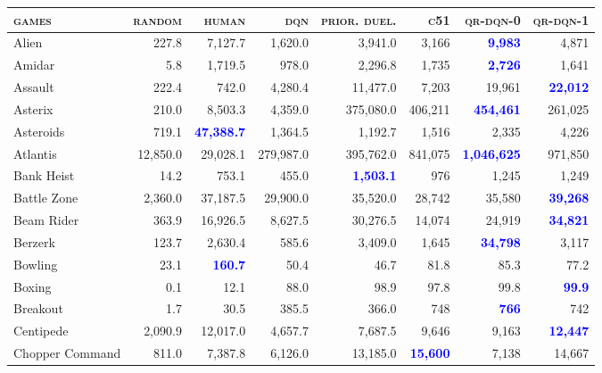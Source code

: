 \documentclass[letterpaper]{article}
\begin{document}
\newpage

\begin{figure}
\small
\centering
\begin{tabular}{ l | r|r|r|r|r|r| r }
  \textbf{\textsc{games}}  &  \textbf{\textsc{random}}  &  \textbf{\textsc{human}}  &  \textbf{\textsc{dqn}}  &   \textbf{\textsc{prior.}} \textbf{\textsc{duel.}}  &  \textbf{\textsc{c51}} & \textbf{\textsc{qr-dqn-0}} & \textbf{\textsc{qr-dqn-1}}\\
\hline
Alien & 227.8 & 7,127.7 & 1,620.0 & 3,941.0 & 3,166 & \textbf{\textcolor{blue}{9,983}} & 4,871 \\
Amidar & 5.8 & 1,719.5 & 978.0 & 2,296.8 & 1,735 & \textbf{\textcolor{blue}{2,726}} & 1,641 \\
Assault & 222.4 & 742.0 & 4,280.4 & 11,477.0 & 7,203 & 19,961 & \textbf{\textcolor{blue}{22,012}} \\
Asterix & 210.0 & 8,503.3 & 4,359.0 & 375,080.0 & 406,211 & \textbf{\textcolor{blue}{454,461}} & 261,025 \\
Asteroids & 719.1 & \textbf{\textcolor{blue}{47,388.7}} & 1,364.5 & 1,192.7 & 1,516 & 2,335 & 4,226 \\
Atlantis & 12,850.0 & 29,028.1 & 279,987.0 & 395,762.0 & 841,075 & \textbf{\textcolor{blue}{1,046,625}} & 971,850 \\
Bank Heist & 14.2 & 753.1 & 455.0 & \textbf{\textcolor{blue}{1,503.1}} & 976 & 1,245 & 1,249 \\
Battle Zone & 2,360.0 & 37,187.5 & 29,900.0 & 35,520.0 & 28,742 & 35,580 & \textbf{\textcolor{blue}{39,268}} \\
Beam Rider & 363.9 & 16,926.5 & 8,627.5 & 30,276.5 & 14,074 & 24,919 & \textbf{\textcolor{blue}{34,821}} \\
Berzerk & 123.7 & 2,630.4 & 585.6 & 3,409.0 & 1,645 & \textbf{\textcolor{blue}{34,798}} & 3,117 \\
Bowling & 23.1 & \textbf{\textcolor{blue}{160.7}} & 50.4 & 46.7 & 81.8 & 85.3 & 77.2 \\
Boxing & 0.1 & 12.1 & 88.0 & 98.9 & 97.8 & 99.8 & \textbf{\textcolor{blue}{99.9}} \\
Breakout & 1.7 & 30.5 & 385.5 & 366.0 & 748 & \textbf{\textcolor{blue}{766}} & 742 \\
Centipede & 2,090.9 & 12,017.0 & 4,657.7 & 7,687.5 & 9,646 & 9,163 & \textbf{\textcolor{blue}{12,447}} \\
Chopper Command & 811.0 & 7,387.8 & 6,126.0 & 13,185.0 & \textbf{\textcolor{blue}{15,600}} & 7,138 & 14,667 \\

\end{tabular}
\end{figure}
\end{document}
